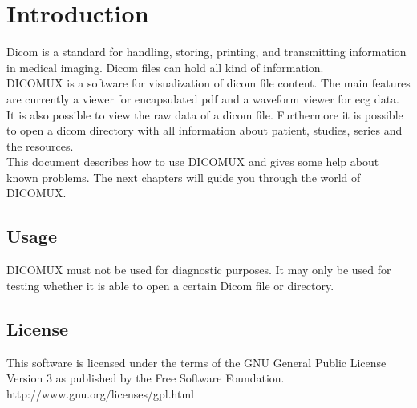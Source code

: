 %
%
\chapter{Introduction}
Dicom is a standard for handling, storing, printing, and transmitting
information in medical imaging. Dicom files can hold all kind of information. \\
DICOMUX is a software for visualization of dicom file content. The main features
are currently a viewer for encapsulated pdf and a waveform viewer for ecg data. 	
It is also possible to view the raw data of a dicom file. Furthermore it is
possible to open a dicom directory with all information about patient, studies,
series and the resources. \\
This document describes how to use DICOMUX and gives some help about known problems.
The next chapters will guide you through the world of DICOMUX.

\section{Usage}
DICOMUX must not be used for diagnostic purposes. It may only be used for testing whether it is able to open a certain Dicom file or directory.

\section{License}
This software is licensed under the terms of the GNU General Public License Version 3 as published by the Free Software Foundation. \\
http://www.gnu.org/licenses/gpl.html 
%
%